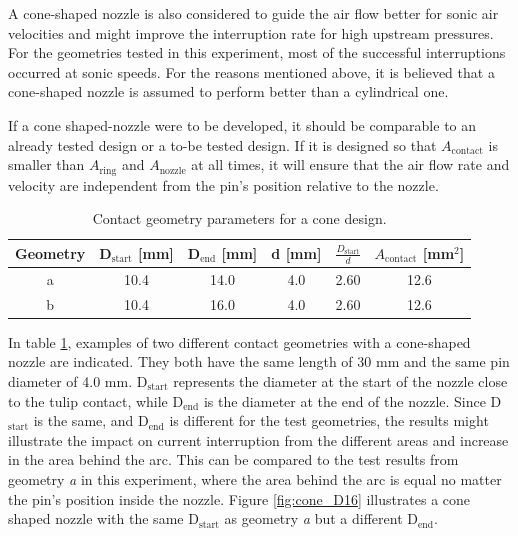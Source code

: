 \documentclass[10pt,a4paper,twoside]{article}
\begin{document}
A cone-shaped nozzle is also considered to guide the air flow better for sonic air velocities and might improve the interruption rate for high upstream pressures. For the geometries tested in this experiment, most of the successful interruptions occurred at sonic speeds. For the reasons mentioned above, it is believed that a cone-shaped nozzle is assumed to perform better than a cylindrical one.

If a cone shaped-nozzle were to be developed, it should be comparable to an already tested design or a to-be tested design. If it is designed so that $A_\mathrm{{contact}}$ is smaller than $A_\mathrm{{ring}}$ and $A_\mathrm{{nozzle}}$ at all times, it will ensure that the air flow rate and velocity are independent from the pin's position relative to the nozzle.

\begin{table}[H]
\center
\caption{Contact geometry parameters for a cone design.}
 \begin{tabular}{|c|c|c|c|c|c|}
\hline 
Geometry & D$_\mathrm{{start}}$ [mm]& D$_\mathrm{{end}}$ [mm] & d [mm] & $\frac{D_\mathrm{{start}}}{d}$ & $A_\mathrm{{contact}}$ [mm$^2$] \\ 
\hline 
a & 10.4 & 14.0 & 4.0 & 2.60 & 12.6  \\ 
\hline 
b & 10.4 & 16.0 & 4.0 & 2.60 & 12.6  \\ 
\hline 
\end{tabular} 
\label{tab:contGeoParaCone}
\end{table}

In table \ref{tab:contGeoParaCone}, examples of two different contact geometries with a cone-shaped nozzle are indicated. They both have the same length of 30 mm and the same pin diameter of 4.0 mm. D$_\mathrm{{start}}$ represents the diameter at the start of the nozzle close to the tulip contact, while D$_\mathrm{{end}}$ is the diameter at the end of the nozzle. Since D$_\mathrm{{start}}$ is the same, and D$_\mathrm{{end}}$ is different for the test geometries, the results might illustrate the impact on current interruption from the different areas and increase in the area behind the arc. This can be compared to the test results from geometry \textit{a} in this experiment, where the area behind the arc is equal no matter the pin's position inside the nozzle. Figure \ref{fig:cone_D16} illustrates a cone shaped nozzle with the same D$_\mathrm{{start}}$ as geometry \textit{a} but a different D$_\mathrm{{end}}$. 
\end{document}
